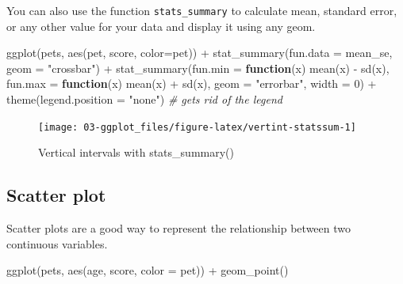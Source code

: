 \documentclass[
  oneside]{book}
\newenvironment{Shaded}{\begin{snugshade}}{\end{snugshade}}
\newcommand{\AttributeTok}[1]{\textcolor[rgb]{0.77,0.63,0.00}{#1}}
\newcommand{\CommentTok}[1]{\textcolor[rgb]{0.56,0.35,0.01}{\textit{#1}}}
\newcommand{\ControlFlowTok}[1]{\textcolor[rgb]{0.13,0.29,0.53}{\textbf{#1}}}
\newcommand{\DecValTok}[1]{\textcolor[rgb]{0.00,0.00,0.81}{#1}}
\newcommand{\FunctionTok}[1]{\textcolor[rgb]{0.00,0.00,0.00}{#1}}
\newcommand{\NormalTok}[1]{#1}
\newcommand{\SpecialCharTok}[1]{\textcolor[rgb]{0.00,0.00,0.00}{#1}}
\newcommand{\StringTok}[1]{\textcolor[rgb]{0.31,0.60,0.02}{#1}}
\begin{document}
You can also use the function \texttt{stats\_summary} to calculate mean, standard error, or any other value for your data and display it using any geom.

\begin{Shaded}
\begin{Highlighting}[]
\FunctionTok{ggplot}\NormalTok{(pets, }\FunctionTok{aes}\NormalTok{(pet, score, }\AttributeTok{color=}\NormalTok{pet)) }\SpecialCharTok{+}
  \FunctionTok{stat\_summary}\NormalTok{(}\AttributeTok{fun.data =}\NormalTok{ mean\_se, }\AttributeTok{geom =} \StringTok{"crossbar"}\NormalTok{) }\SpecialCharTok{+}
  \FunctionTok{stat\_summary}\NormalTok{(}\AttributeTok{fun.min =} \ControlFlowTok{function}\NormalTok{(x) }\FunctionTok{mean}\NormalTok{(x) }\SpecialCharTok{{-}} \FunctionTok{sd}\NormalTok{(x),}
               \AttributeTok{fun.max =} \ControlFlowTok{function}\NormalTok{(x) }\FunctionTok{mean}\NormalTok{(x) }\SpecialCharTok{+} \FunctionTok{sd}\NormalTok{(x),}
               \AttributeTok{geom =} \StringTok{"errorbar"}\NormalTok{, }\AttributeTok{width =} \DecValTok{0}\NormalTok{) }\SpecialCharTok{+}
  \FunctionTok{theme}\NormalTok{(}\AttributeTok{legend.position =} \StringTok{"none"}\NormalTok{) }\CommentTok{\# gets rid of the legend}
\end{Highlighting}
\end{Shaded}

\begin{figure}

{\centering \texttt{[image: 03-ggplot\_files/figure-latex/vertint-statssum-1]} 

}

\caption{Vertical intervals with stats_summary()}\label{fig:vertint-statssum}
\end{figure}

\hypertarget{geom_point}{%
\subsection{Scatter plot}\label{geom_point}}

Scatter plots are a good way to represent the relationship between two continuous variables.

\begin{Shaded}
\begin{Highlighting}[]
\FunctionTok{ggplot}\NormalTok{(pets, }\FunctionTok{aes}\NormalTok{(age, score, }\AttributeTok{color =}\NormalTok{ pet)) }\SpecialCharTok{+}
  \FunctionTok{geom\_point}\NormalTok{()}
\end{Highlighting}
\end{Shaded}
\end{document}

